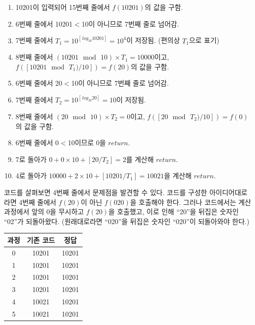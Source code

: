 \documentclass{oblivoir}
\begin{document}
\begin{enumerate}
\item 10201이 입력되어 15번째 줄에서 $f(10201)$의 값을 구함.
\item 6번째 줄에서 10201$<$10이 아니므로 7번째 줄로 넘어감.
\item 7번째 줄에서 $T_1=10^{\left[ \,log_{10}10201 \right]} = 10^4$이 저장됨. (편의상 $T_1$으로 표기)
\item 8번째 줄에서 $(10201\,\bmod\,10)\times T_1 = 10000$이고, $f(\left[ 10201\,\bmod\,T_1)/10 \right]) = f(20)$의 값을 구함.
\item 6번째 줄에서 20$<$10이 아니므로 7번째 줄로 넘어감.
\item 7번째 줄에서 $T_2=10^{\left[ \,log_{10}20 \right]} = 10$이 저장됨.
\item 8번째 줄에서 $(20\,\bmod\,10)\times T_2 = 0$이고, $f(\left[ 20\,\bmod\,T_2)/10 \right]) = f(0)$의 값을 구함.
\item 6번째 줄에서 0$<$10이므로 0을 $return$.
\item 7로 돌아가 $0 + 0\times 10 + \left[ 20\slash T_2 \right] = 2$를 계산해 $return$.
\item 4로 돌아가 $10000 + 2\times 10 + \left[ 10201\slash T_1 \right] = 10021$을 계산해 $return$.
\end{enumerate}

코드를 살펴보면 4번째 줄에서 문제점을 발견할 수 있다. 코드를 구성한 아이디어대로라면 4번째 줄에서 $f(20)$이 아닌 $f(020)$을 호출해야 한다. 그러나 코드에서는 계산 과정에서 앞의 0을 무시하고 $f(20)$을 호출했고, 이로 인해 ``{\color{Red}20}''을 뒤집은 숫자인 ``{\color{Red}02}''가 되돌아왔다. (원래대로라면  ``{\color{Green}020}''을 뒤집은 숫자인 ``{\color{Green}020}''이 되돌아와야 한다.)
\\

\begin{center}
\begin{tabular}{c|c|c}\hline
과정 & 기존 코드 & 정답 \\\hline\hline
0 & 10201 & 10201 \\
1 & {\color{Red}10201} & {\color{Green}10201} \\
2 & 1{\color{Red}020}1 & 1{\color{Green}020}1 \\
3 & 10{\color{Red}20}1 & 1{\color{Green}020}1 \\
4 & 10{\color{Red}02}1 & 10{\color{Green}2}01 \\
5 & 10021 & 10201 \\
\end{tabular}
\end{center} 
\vspace{10pt}
\end{document}
